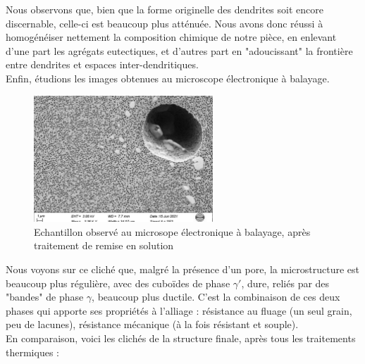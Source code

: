 Nous observons que, bien que la forme originelle des dendrites soit encore discernable, 
celle-ci est beaucoup plus atténuée. Nous avons donc réussi à homogénéiser nettement
la composition chimique de notre pièce, en enlevant d'une part les agrégats eutectiques, 
et d'autres part en "adoucissant" la frontière entre dendrites et espaces inter-dendritiques.\\

Enfin, étudions les images obtenues au microscope électronique à balayage.

\begin{figure}[H]
    \centering
    \includegraphics[width=0.6\textwidth]{images_meb/RS1913.pdf}
    \caption{Echantillon observé au microsope électronique à balayage, 
    après traitement de remise en solution\\}
    \label{fig:RES_MEB}
\end{figure}

Nous voyons sur ce cliché que, malgré la présence d'un pore, la microstructure
est beaucoup plus régulière, avec des cuboïdes de phase $\gamma'$, dure, reliés
par des "bandes" de phase $\gamma$, beaucoup plus ductile. C'est la combinaison 
de ces deux phases qui apporte ses propriétés à l'alliage : résistance au fluage
(un seul grain, peu de lacunes), résistance mécanique (à la fois résistant et souple).\\

En comparaison, voici les clichés de la structure finale, après tous les 
traitements thermiques :\\

